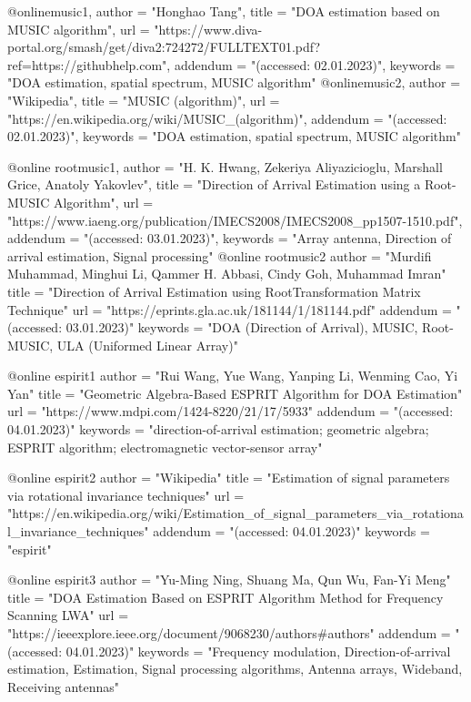 @online{music1,
    author = "Honghao Tang",
    title = "DOA estimation based on MUSIC algorithm",
    url  = "https://www.diva-portal.org/smash/get/diva2:724272/FULLTEXT01.pdf?ref=https://githubhelp.com",
    addendum = "(accessed: 02.01.2023)",
    keywords = "DOA estimation, spatial spectrum, MUSIC algorithm"
}
@online{music2,
    author = "Wikipedia",
    title = "MUSIC (algorithm)",
    url = "https://en.wikipedia.org/wiki/MUSIC_(algorithm)",
    addendum = "(accessed: 02.01.2023)",
    keywords = "DOA estimation, spatial spectrum, MUSIC algorithm"
}

@online{
    rootmusic1,
    author = "H. K. Hwang, Zekeriya Aliyazicioglu, Marshall Grice, Anatoly Yakovlev",
    title = "Direction of Arrival Estimation using a Root-MUSIC Algorithm",
    url = "https://www.iaeng.org/publication/IMECS2008/IMECS2008_pp1507-1510.pdf",
    addendum = "(accessed: 03.01.2023)",
    keywords = "Array antenna, Direction of arrival estimation, Signal processing"
}
@online{
	rootmusic2
	author = "Murdifi Muhammad, Minghui Li, Qammer H. Abbasi, Cindy Goh, Muhammad Imran"
	title = "Direction of Arrival Estimation using RootTransformation Matrix Technique"
	url = "https://eprints.gla.ac.uk/181144/1/181144.pdf"
	addendum = "(accessed: 03.01.2023)"
	keywords = "DOA (Direction of Arrival), MUSIC, Root-MUSIC, ULA (Uniformed Linear Array)"
}

@online{
	espirit1
	author = "Rui Wang, Yue Wang, Yanping Li, Wenming Cao, Yi Yan"
	title = "Geometric Algebra-Based ESPRIT Algorithm for DOA Estimation"
	url = "https://www.mdpi.com/1424-8220/21/17/5933"
	addendum = "(accessed: 04.01.2023)"
	keywords = "direction-of-arrival estimation; geometric algebra; ESPRIT algorithm; electromagnetic vector-sensor array"
}

@online{
	espirit2
	author = "Wikipedia"
	title = "Estimation of signal parameters via rotational invariance techniques"
	url = "https://en.wikipedia.org/wiki/Estimation_of_signal_parameters_via_rotational_invariance_techniques"
	addendum = "(accessed: 04.01.2023)"
	keywords = "espirit"
}

@online{
	espirit3
	author = "Yu-Ming Ning, Shuang Ma, Qun Wu, Fan-Yi Meng"
	title = "DOA Estimation Based on ESPRIT Algorithm Method for Frequency Scanning LWA"
	url = "https://ieeexplore.ieee.org/document/9068230/authors#authors"
	addendum = "(accessed: 04.01.2023)"
	keywords = "Frequency modulation, Direction-of-arrival estimation, Estimation, Signal processing algorithms, Antenna arrays, Wideband, Receiving antennas"
}
